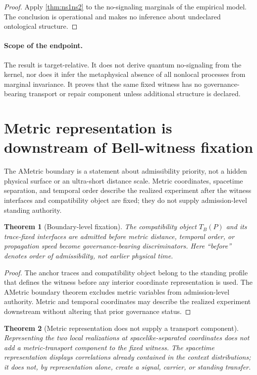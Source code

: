 \documentclass[11pt]{article}
\newtheorem{theorem}{Theorem}[section]
\theoremstyle{definition}
\begin{document}
\begin{proof}
Apply \cref{thm:ns1ns2} to the no-signaling marginals of the empirical model. The conclusion is operational and makes no inference about undeclared ontological structure.
\end{proof}

\paragraph{Scope of the endpoint.}
The result is target-relative. It does not derive quantum no-signaling from the kernel, nor does it infer the metaphysical absence of all nonlocal processes from marginal invariance. It proves that the same fixed witness has no governance-bearing transport or repair component unless additional structure is declared.

\section{Metric representation is downstream of Bell-witness fixation}\label{sec:ametric}

The AMetric boundary is a statement about admissibility priority, not a hidden physical surface or an ultra-short distance scale. Metric coordinates, spacetime separation, and temporal order describe the realized experiment after the witness interfaces and compatibility object are fixed; they do not supply admission-level standing authority.

\begin{theorem}[Boundary-level fixation]\label{thm:boundarylevel}
The compatibility object $T_B(P)$ and its trace-fixed interfaces are admitted before metric distance, temporal order, or propagation speed become governance-bearing discriminators. Here ``before'' denotes order of admissibility, not earlier physical time.
\end{theorem}

\begin{proof}
The anchor traces and compatibility object belong to the standing profile that defines the witness before any interior coordinate representation is used. The AMetric boundary theorem excludes metric variables from admission-level authority. Metric and temporal coordinates may describe the realized experiment downstream without altering that prior governance status.
\end{proof}

\begin{theorem}[Metric representation does not supply a transport component]\label{thm:instant}
Representing the two local realizations at spacelike-separated coordinates does not add a metric-transport component to the fixed witness. The spacetime representation displays correlations already contained in the context distributions; it does not, by representation alone, create a signal, carrier, or standing transfer.
\end{theorem}
\end{document}
